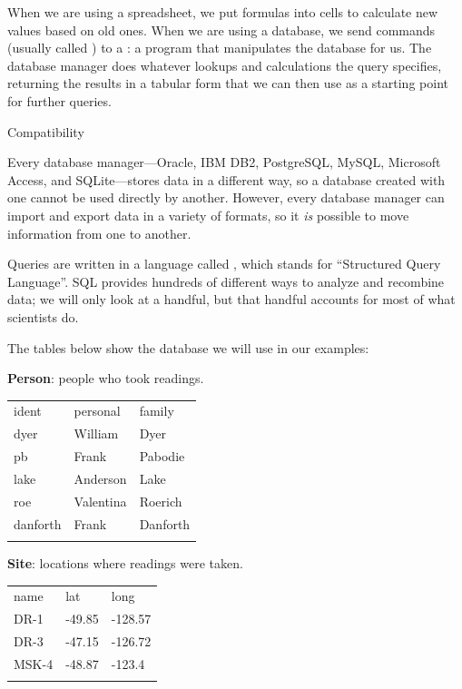 \documentclass{book}
\begin{document}
When we are using a spreadsheet, we put formulas into cells to calculate
new values based on old ones. When we are using a database, we send
commands (usually called ) to a
: a program that
manipulates the database for us. The database manager does whatever
lookups and calculations the query specifies, returning the results in a
tabular form that we can then use as a starting point for further
queries.

\begin{swcbox}{Compatibility}

Every database manager---Oracle, IBM DB2, PostgreSQL, MySQL, Microsoft
Access, and SQLite---stores data in a different way, so a database
created with one cannot be used directly by another. However, every
database manager can import and export data in a variety of formats, so
it \emph{is} possible to move information from one to another.

\end{swcbox}

Queries are written in a language called , which
stands for ``Structured Query Language''. SQL provides hundreds of
different ways to analyze and recombine data; we will only look at a
handful, but that handful accounts for most of what scientists do.

The tables below show the database we will use in our examples:

\textbf{Person}: people who took readings.

\begin{tabular}{@{}lll@{}}
\hline\noalign{\medskip}
ident & personal & family
\\\noalign{\medskip}
\hline\noalign{\medskip}
dyer & William & Dyer
\\\noalign{\medskip}
pb & Frank & Pabodie
\\\noalign{\medskip}
lake & Anderson & Lake
\\\noalign{\medskip}
roe & Valentina & Roerich
\\\noalign{\medskip}
danforth & Frank & Danforth
\\\noalign{\medskip}
\hline
\end{tabular}

\textbf{Site}: locations where readings were taken.

\begin{tabular}{@{}lll@{}}
\hline\noalign{\medskip}
name & lat & long
\\\noalign{\medskip}
\hline\noalign{\medskip}
DR-1 & -49.85 & -128.57
\\\noalign{\medskip}
DR-3 & -47.15 & -126.72
\\\noalign{\medskip}
MSK-4 & -48.87 & -123.4
\\\noalign{\medskip}
\hline
\end{tabular}
\end{document}
